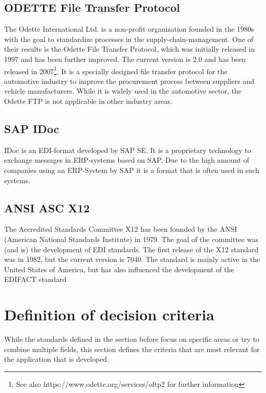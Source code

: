 \subsection{ODETTE File Transfer Protocol}
\label{sec2.1.5}

The Odette International Ltd. is a non-profit organization founded in the 1980s with the goal to standardize processes in the supply-chain-management. One of their results is the Odette File Transfer Protocol, which was initially released in 1997 and has been further improved. The current version is 2.0 and has been released in 2007\footnote{See also https://www.odette.org/services/oftp2 for further information}. It is a specially designed file transfer protocol for the automotive industry to improve the procurement process between suppliers and vehicle manufacturers. While it is widely used in the automotive sector, the Odette FTP is not applicable in other industry areas.

\subsection{SAP IDoc}
\label{sec2.1.6}

IDoc is an EDI-format developed by SAP SE. It is a proprietary technology to exchange messages in ERP-systems based on SAP. Due to the high amount of companies using an ERP-System by SAP it is a format that is often used in such systems.

\subsection{ANSI ASC X12}
\label{sec2.1.7}

The Accredited Standards Committee X12 has been founded by the ANSI (American National Standards Institute) in 1979. The goal of the committee was (and is) the development of EDI standards. The first release of the X12 standard was in 1982, but the current version is 7040. The standard is mainly active in the United States of America, but has also influenced the development of the EDIFACT standard

\section{Definition of decision criteria}
\label{sec2.2}

While the standards defined in the section before focus on specific areas or try to combine multiple fields, this section defines the criteria that are most relevant for the application that is developed.

